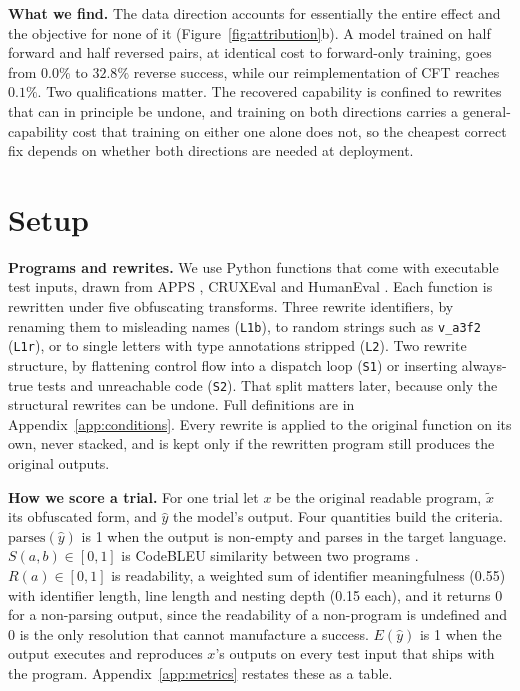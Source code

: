 \documentclass{article}
\newcommand{\arm}[1]{\texttt{#1}}
\begin{document}
\textbf{What we find.} The data direction accounts for essentially the entire effect and the
objective for none of it (Figure~\ref{fig:attribution}b). A model trained on half forward and
half reversed pairs, at identical cost to forward-only training, goes from $0.0\%$ to $32.8\%$
reverse success, while our reimplementation of CFT reaches $0.1\%$. Two qualifications matter.
The recovered capability is confined to rewrites that can in principle be undone, and training
on both directions carries a general-capability cost that training on either one alone does
not, so the cheapest correct fix depends on whether both directions are needed at deployment.

\section{Setup}
\label{sec:setup}

\textbf{Programs and rewrites.} We use Python functions that come with executable test
inputs, drawn from APPS \citep{hendrycks2021apps}, CRUXEval \citep{gu2024cruxeval} and
HumanEval \citep{chen2021codex}. Each function is rewritten under five obfuscating transforms. Three rewrite identifiers, by
renaming them to misleading names (\arm{L1b}), to random strings such as \texttt{v\_a3f2}
(\arm{L1r}), or to single letters with type annotations stripped (\arm{L2}). Two rewrite
structure, by flattening control flow into a dispatch loop (\arm{S1}) or inserting
always-true tests and unreachable code (\arm{S2}). That split matters later, because only the
structural rewrites can be undone. Full definitions are in Appendix~\ref{app:conditions}.
Every rewrite is applied to the original function on its own, never stacked, and is kept only
if the rewritten program still produces the original outputs.

\textbf{How we score a trial.} For one trial let $x$ be the original readable program,
$\tilde x$ its obfuscated form, and $\hat y$ the model's output. Four quantities build the
criteria. $\mathrm{parses}(\hat y)$ is 1 when the output is non-empty and parses in the target
language. $S(a,b)\in[0,1]$ is CodeBLEU similarity between two programs
\citep{ren2020codebleu}. $R(a)\in[0,1]$ is readability, a weighted sum of identifier
meaningfulness (0.55) with identifier length, line length and nesting depth (0.15 each), and it
returns 0 for a non-parsing output, since the readability of a non-program is undefined and 0
is the only resolution that cannot manufacture a success. $E(\hat y)$ is 1 when the output
executes and reproduces $x$'s outputs on every test input that ships with the program.
Appendix~\ref{app:metrics} restates these as a table.
\end{document}
